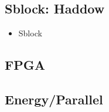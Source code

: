 \subsection{Sblock: Haddow \cite{haddow2000sblock}}

\begin{itemize}
    \item Sblock
\end{itemize}

\subsection{FPGA}

\TODO

\subsection{Energy/Parallel}

\TODO

